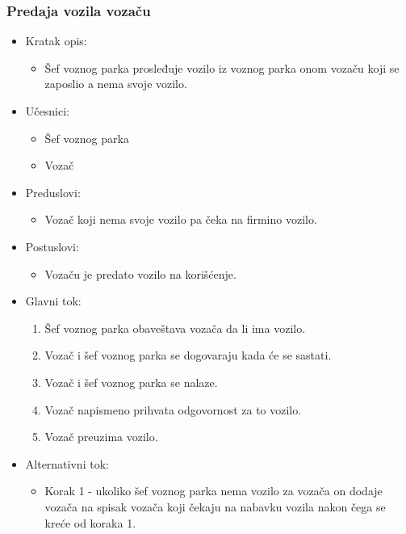 \subsubsection{\bfseries Predaja vozila vozaču}
\begin{itemize}
	\item Kratak opis:
		\begin{itemize}
			\item Šef voznog parka prosleđuje vozilo iz voznog parka onom vozaču koji se zaposlio a nema svoje vozilo.
		\end{itemize}

	\item Učesnici:
		\begin{itemize}
		    \item Šef voznog parka
			\item Vozač
		\end{itemize}


	\item Preduslovi:
		\begin{itemize}
		    \item Vozač koji nema svoje vozilo pa čeka na firmino vozilo.
		\end{itemize}


	\item Postuslovi:
		\begin{itemize}
			\item Vozaču je predato vozilo na korišćenje.
	\end{itemize}

	\item Glavni tok:
		\begin{enumerate}
		    \item Šef voznog parka obaveštava vozača da li ima vozilo.
		    \item Vozač i šef voznog parka se dogovaraju kada će se sastati.
		    \item Vozač i šef voznog parka se nalaze.
			\item Vozač napismeno prihvata odgovornost za to vozilo.
			\item Vozač preuzima vozilo.
		\end{enumerate}

	\item Alternativni tok:
		\begin{itemize}
		    \item Korak 1 - ukoliko šef voznog parka nema vozilo za vozača on dodaje vozača na spisak vozača koji čekaju na nabavku vozila nakon čega se kreće od koraka 1.
		\end{itemize}

\end{itemize}

